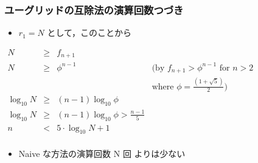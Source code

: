 \begin{frame}
\frametitle{ユーグリッドの互除法の演算回数\textemdash つづき}
  \begin{itemize}
\item $r_1=N$ として，このことから
  \end{itemize}
  \begin{center}  
    \begin{math}
      \begin{array}{rcll}
N&\ge& f_{n+1}\\
N&\ge& \phi^{n-1}&(\mbox{by }f_{n+1}>\phi^{n-1} \mbox{ for }n>2\\
                &&&\mbox{where }\phi=\frac{(1+\sqrt{5})}{2})\\
\log_{10}N&\ge&(n-1)\log_{10}\phi\\
\log_{10}N&\ge&(n-1)\log_{10}\phi>\frac{n-1}{5}\\
n&<&5\cdot\log_{10}N+1\\
      \end{array}
    \end{math}
  \end{center}
  \begin{itemize}
\item Naive な方法の演算回数 N 回 よりは少ない
  \end{itemize}
\end{frame}
